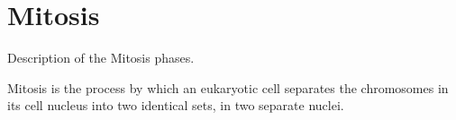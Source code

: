 \chapter{Mitosis}
\label{appendixA}
\thispagestyle{empty}


Description of the Mitosis phases. \cite{molBiologyCell, biology}

Mitosis is the process by
which an eukaryotic cell separates the chromosomes in
its cell nucleus into two identical sets, in two separate
nuclei.
